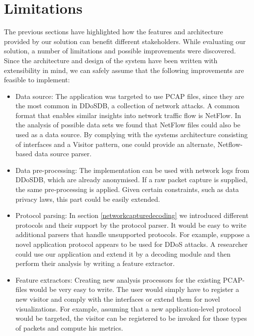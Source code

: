\section{Limitations}\label{limitations}%
The previous sections have highlighted how the features and architecture provided by our solution can benefit different stakeholders.
While evaluating our solution, a number of limitations and possible improvements were discovered. Since the architecture and design of the system have been written with extensibility in mind, we can safely assume that the following improvements are feasible to implement:
\begin{itemize}

    \item Data source: The application was targeted to use PCAP files, since they are the most common in DDoSDB, a collection of network attacks. A common format that enables similar insights into network traffic flow is NetFlow. In the analysis of possible data sets we found that NetFlow files could also be used as a data source. By complying with the systems architecture consisting of interfaces and a Visitor pattern, one could provide an alternate, Netflow-based data source parser.
    
    \item Data pre-processing: The implementation can be used with network logs from DDoSDB, which are already anonymised. If a raw packet capture is supplied, the same pre-processing is applied. Given certain constraints, such as data privacy laws, this part could be easily extended.
    
    \item Protocol parsing: 
    In section \ref{networkcapturedecoding} we introduced different protocols and their support by the protocol parser. It would be easy to write additional parsers that handle unsupported protocols. For example, suppose a novel application protocol appears to be used for DDoS attacks. A researcher could use our application and extend it by a decoding module and then perform their analysis by writing a feature extractor.
    
    \item Feature extractors:
    Creating new analysis processors for the existing PCAP-files would be very easy to write. The user would simply have to register a new visitor and comply with the interfaces or extend them for novel visualizations. For example, assuming that a new application-level protocol would be targeted, the visitor can be registered to be invoked for those types of packets and compute his metrics.
   

\end{itemize}
